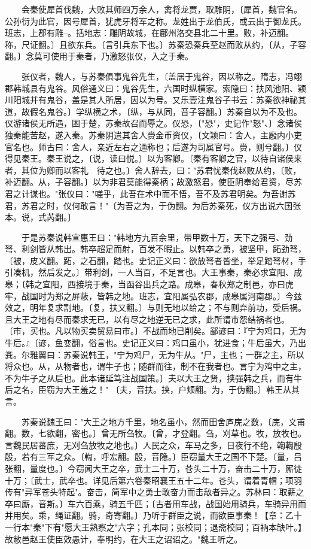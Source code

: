 　　会秦使犀首伐魏，大败其师四万余人，禽将龙贾，取雕阴，〔犀首，魏官名。公孙衍为此官，因号犀首，犹虎牙将军之称。龙姓出于龙伯氏，或云出于御龙氏。班志，上郡有雕--。括地志：雕阴故城，在鄜州洛交县北二十里。败，补迈翻。称，尺证翻。〕且欲东兵。〔言引兵东下也。〕苏秦恐秦兵至赵而败从约，〔从，子容翻。〕念莫可使用于秦者，乃激怒张仪，入之于秦。

　　张仪者，魏人，与苏秦俱事鬼谷先生，〔盖居于鬼谷，因以称之。隋志，冯翊郡韩城县有鬼谷。风俗通义曰：鬼谷先生，六国时纵横家。索隐曰：扶风池阳、颖川阳城并有鬼谷，盖是其人所居，因以为号。又乐壹注鬼谷子书云：苏秦欲神祕其道，故假名鬼谷。〕学纵横之术，〔纵，与从同，音子容翻。〕苏秦自以为不及也。仪游诸侯无所遇，困于楚，苏秦故召而辱之。仪恐，〔"恐"，史记作"怒"、〕念诸侯独秦能苦赵，遂入秦。苏秦阴遣其舍人赍金币资仪，〔文颖曰：舍人，主廏内小吏官名也。师古曰：舍人，亲近左右之通称也；后遂为司属官号。赍，则兮翻。〕仪得见秦王。秦王说之，〔说，读曰悦。〕以为客卿。〔秦有客卿之官，以待自诸侯来者，其位为卿而以客礼　待之也。〕舍人辞去，曰："苏君忧秦伐赵败从约，〔败，补迈翻。从，子容翻。〕以为非君莫能得秦柄；故激怒君，使臣阴奉给君资，尽苏君之计谋也。"张仪曰："嗟乎，此吾在术中而不悟，吾不及苏君明矣。为吾谢苏君，苏君之时，仪何敢言！"〔为吾之为，于伪翻。为后苏秦死，仪方出说六国张本。说，式芮翻。〕

　　于是苏秦说韩宣惠王曰："韩地方九百余里，带甲数十万，天下之强弓、劲弩、利剑皆从韩出。韩卒超足而射，百发不暇止。以韩卒之勇，被坚甲，跖劲弩，〔被，皮义翻。跖，之石翻，踏也。史记正义曰：欲放弩者皆坐，举足踏弩材，手引凑机，然后发之。〕带利剑，一人当百，不足言也。大王事秦，秦必求宜阳、成皋；〔韩之宜阳，西接境于秦，当函谷出兵之路。成皋，春秋郑之制邑，亦曰虎牢，战国时为郑之屏蔽，皆韩之地。班志，宜阳属弘农郡，成皋属河南郡。〕今兹效之，明年复求割地。〔复，扶又翻。〕与则无地以给之；不与则弃前功，受后祸。且大王之地有尽而秦求无已，以有尽之地逆无已之求，此所谓市怨结祸者也。〔市，买也。凡以物买卖贸易曰市。〕不战而地已削矣。鄙谚曰：『宁为鸡口，无为牛后。』〔谚，鱼变翻，俗言也。史记正义曰：鸡口虽小，犹进食；牛后虽大，乃出粪。尔雅翼曰：苏秦说韩王，"宁为鸡尸，无为牛从。"尸，主也；一群之主，所以将众也。从，从物者也，谓牛子也；随群而往，制不在我者也。言宁为鸡中之主，不为牛子之从后也。此本诸延笃注战国策。〕夫以大王之贤，挟强韩之兵，而有牛后之名，臣窃为大王羞之！" 〔夫，音扶。挟，户颊翻。为，于伪翻。〕韩王从其言。

　　苏秦说魏王曰："大王之地方千里，地名虽小，然而田舍庐庑之数，〔庑，文甫翻。数，七欲翻，密也。〕曾无所刍牧。〔曾，才登翻。刍，刈草也。牧，放牧也。言魏民居蕃庶，无刈刍放牧之地也。〕人民之众，车马之多，日夜行不绝，輷輷殷殷，若有三军之众。〔輷，呼宏翻。殷，音隐。〕臣窃量大王之国不下楚。〔量，吕张翻，量度也。〕今窃闻大王之卒，武士二十万，苍头二十万，奋击二十万，厮徒十万；〔武士，武卒也。详见后第六卷秦昭襄王五十二年。苍头，谓着青帽；项羽传有"异军苍头特起"。奋击，简军中之勇士敢奋力而击敌者异之。苏林曰：取薪之卒曰厮，音斯。〕车六百乘，骑五千匹；〔古者用车战，战国始用骑兵，车骑异用而并用矣。乘，绳证翻。骑，奇寄翻。〕乃听于群臣之说，而欲臣事秦！【章：乙十一行本"秦"下有"愿大王熟察之"六字；孔本同；张校同；退斋校同；百衲本缺叶。】故敝邑赵王使臣效愚计，奉明约，在大王之诏诏之。"魏王听之。

